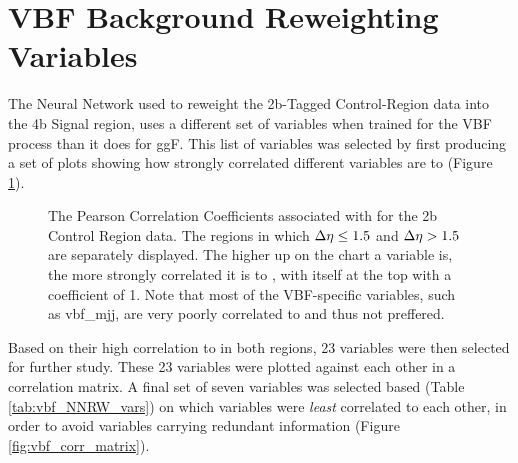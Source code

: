 \section{VBF Background Reweighting Variables} \label{sec:vbf_bgdNNRW}

    The Neural Network used to reweight the 2b-Tagged Control-Region data into the 4b Signal region,
        uses a different set of variables when trained for the VBF process than it does for ggF.
    This list of variables was selected by first producing a set of plots showing how strongly correlated different variables are to \mhh
        (Figure \ref{fig:mhh_corr}).

    \begin{figure}[!htbp]
        \caption{
            The Pearson Correlation Coefficients associated with \mhh for the 2b Control Region data.
            The regions in which $\Delta \eta \leq 1.5$ and $\Delta \eta>1.5$ are separately displayed.
            The higher up on the chart a variable is, the more strongly correlated it is to \mhh,
                with \mhh itself at the top with a coefficient of 1.
            Note that most of the VBF-specific variables, such as vbf\_mjj, are very poorly correlated to \mhh and thus not preffered.
        }
        \label{fig:mhh_corr}
    \end{figure}

    Based on their high correlation to \mhh in both \deta regions, 23 variables were then selected for further study.
    These 23 variables were plotted against each other in a correlation matrix.
    A final set of seven variables was selected based (Table \ref{tab:vbf_NNRW_vars}) on which variables were \textit{least} correlated to each other,
        in order to avoid variables carrying redundant information (Figure \ref{fig:vbf_corr_matrix}).

